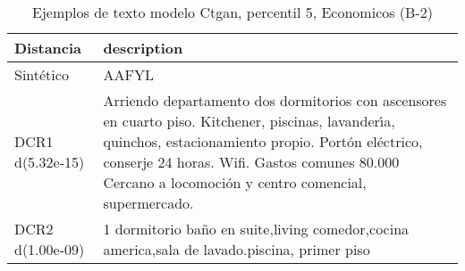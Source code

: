\begin{table}[H]
\centering
\fontsize{10}{14}\selectfont
\caption{Ejemplos de texto modelo Ctgan, percentil 5, Economicos (B-2)}
\label{table-example-economicos-b-2-ctgan-5p-text}
\begin{tabular}{|l|m{35em}|}
\hline
\rowcolor[gray]{0.8}
Distancia & description \\
\hline Sintético & AAFYL \\
\hline DCR1 d(5.32e-15) & Arriendo departamento dos dormitorios con ascensores en cuarto piso.
Kitchener, piscinas, lavander{\'\i}a, quinchos, estacionamiento propio.
Port\'on el\'ectrico, conserje 24 horas.
Wifi. Gastos  comunes 80.000
Cercano a locomoci\'on y centro comencial, supermercado. \\
\hline DCR2 d(1.00e-09) & 1 dormitorio ba\~no en suite,living comedor,cocina america,sala de lavado.piscina, primer piso \\
\hline
\end{tabular}
\end{table}
